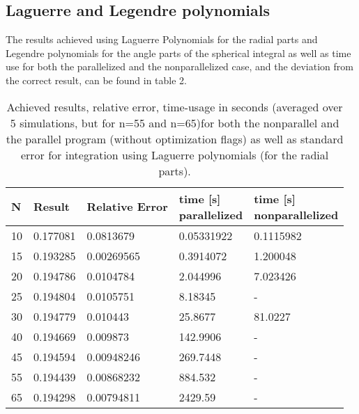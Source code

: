 \documentclass[10pt,a4paper]{article}
\begin{document}
\subsection{Laguerre and Legendre polynomials}

The results achieved using Laguerre Polynomials for the radial parts and Legendre polynomials for the angle parts of the spherical integral as well as time use for both the parallelized and the nonparallelized case, and the deviation from the correct result, can be found in table 2.

\begin{table}[H]
\caption[Spherical Quadrature using Laguerre polynomials]{Achieved results, relative error, time-usage in seconds (averaged over 5 simulations, but for n=55 and n=65)for both the nonparallel and the parallel program (without optimization flags) as well as standard error for integration using Laguerre polynomials (for the radial parts).}
\begin{tabular}{|l|l|l|l|l|}
\hline
N         & Result   & Relative Error & \pbox{10cm}{time {[}s{]}\\ parallelized}  &  \pbox{10cm}{time {[}s{]}\\ nonparallelized} \\ \hline
10 & 0.177081 & 0.0813679      & 0.05331922                              & 0.1115982 \\ \hline
15 & 0.193285 & 0.00269565     & 0.3914072                               & 1.200048  \\ \hline
20 & 0.194786 & 0.0104784      & 2.044996                                & 7.023426  \\ \hline
25 & 0.194804 & 0.0105751      & 8.18345                                 & -       \\ \hline
30 & 0.194779 & 0.010443       & 25.8677                                 & 81.0227   \\ \hline
40 & 0.194669 & 0.009873       & 142.9906                                & -       \\ \hline
45 & 0.194594 & 0.00948246     & 269.7448                                & -       \\ \hline
55 & 0.194439 & 0.00868232     & 884.532                                 & -       \\ \hline
65 & 0.194298 & 0.00794811     & 2429.59                                 & -       \\ \hline
\end{tabular}
\end{table}
\end{document}
